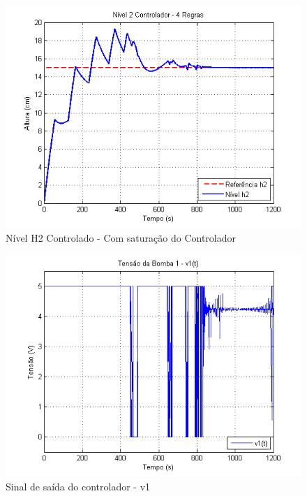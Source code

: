 \begin{figure}[H]
	\centering
	\includegraphics[height=0.35\paperheight, keepaspectratio]{img/nm_ctrl_h2ts2_ulim.png}
	\caption{Nível H2 Controlado - Com saturação do Controlador }
	\label{figH2CtrlTS2_ulim_nm}
\end{figure}

\begin{figure}[H]
	\centering
	\includegraphics[height=0.35\paperheight, keepaspectratio]{img/nm_u1_ulim.png}
	\caption{\small Sinal de saída do controlador - v1 }
	\label{figNm_u1_ulim}
\end{figure}

